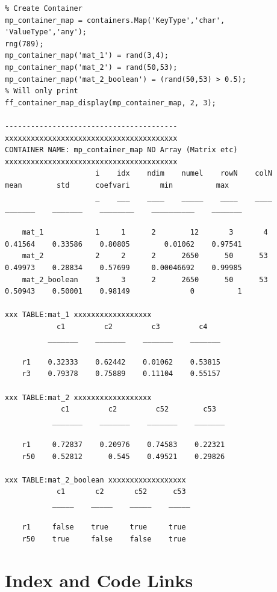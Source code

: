 \documentclass[
]{book}
\begin{document}
\begin{verbatim}
% Create Container
mp_container_map = containers.Map('KeyType','char', 'ValueType','any');
rng(789);
mp_container_map('mat_1') = rand(3,4);
mp_container_map('mat_2') = rand(50,53);
mp_container_map('mat_2_boolean') = (rand(50,53) > 0.5);
% Will only print 
ff_container_map_display(mp_container_map, 2, 3);

----------------------------------------
xxxxxxxxxxxxxxxxxxxxxxxxxxxxxxxxxxxxxxxx
CONTAINER NAME: mp_container_map ND Array (Matrix etc)
xxxxxxxxxxxxxxxxxxxxxxxxxxxxxxxxxxxxxxxx
                     i    idx    ndim    numel    rowN    colN     mean        std      coefvari       min          max  
                     _    ___    ____    _____    ____    ____    _______    _______    ________    __________    _______

    mat_1            1     1      2        12       3       4     0.41564    0.33586    0.80805        0.01062    0.97541
    mat_2            2     2      2      2650      50      53     0.49973    0.28834    0.57699     0.00046692    0.99985
    mat_2_boolean    3     3      2      2650      50      53     0.50943    0.50001    0.98149              0          1

xxx TABLE:mat_1 xxxxxxxxxxxxxxxxxx
            c1         c2         c3         c4   
          _______    _______    _______    _______

    r1    0.32333    0.62442    0.01062    0.53815
    r3    0.79378    0.75889    0.11104    0.55157

xxx TABLE:mat_2 xxxxxxxxxxxxxxxxxx
             c1         c2         c52        c53  
           _______    _______    _______    _______

    r1     0.72837    0.20976    0.74583    0.22321
    r50    0.52812      0.545    0.49521    0.29826

xxx TABLE:mat_2_boolean xxxxxxxxxxxxxxxxxx
            c1       c2       c52      c53 
           _____    _____    _____    _____

    r1     false    true     true     true 
    r50    true     false    false    true
\end{verbatim}

\hypertarget{appendix-appendix}{%
\appendix}


\hypertarget{index-and-code-links}{%
\chapter{Index and Code Links}\label{index-and-code-links}}
\end{document}
